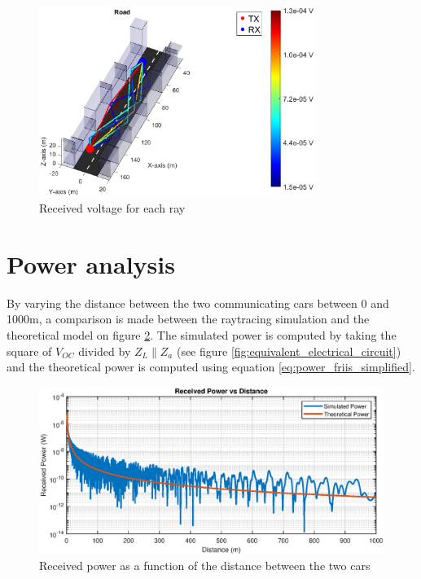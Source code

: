 \documentclass[10pt,a4paper]{ULBreport}
\begin{document}
\begin{figure}[H]
    \centering
    \includegraphics[width=0.8\textwidth]{3_2.eps}
    \caption{Received voltage for each ray}
    \label{fig:voltageDemo}
\end{figure}

\section{Power analysis}

By varying the distance between the two communicating cars between 0 and 1000m, a comparison is made between the raytracing simulation and the theoretical model on figure \ref{fig:P_RX(d)}. The simulated power is computed by taking the square of $V_{OC}$ divided by $Z_L \mathbin{\|} Z_a$ (see figure \ref{fig:equivalent_electrical_circuit}) and the theoretical power is computed using equation \ref{eq:power_friis_simplified}.

\begin{figure}[H]
    \centering
    \includegraphics[width=1\textwidth]{3_3.eps}
    \caption{Received power as a function of the distance between the two cars}
    \label{fig:P_RX(d)}
\end{figure}
\end{document}
